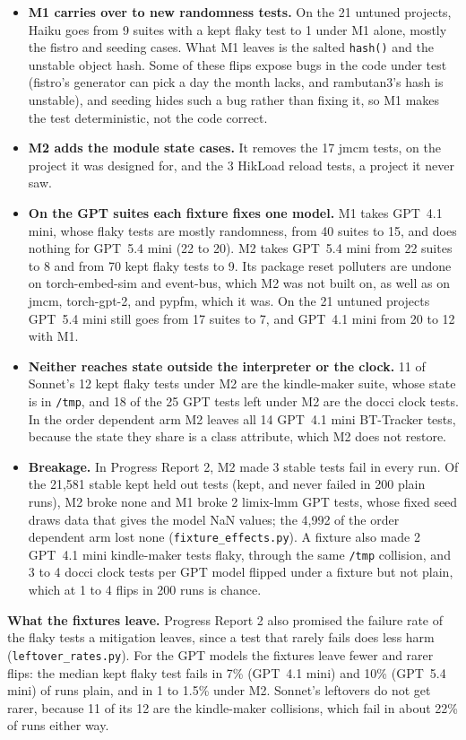 \begin{itemize}
\item \textbf{M1 carries over to new randomness tests.} On the 21 untuned projects, Haiku goes from 9 suites with a kept flaky test to 1 under M1 alone, mostly the fistro and seeding cases. What M1 leaves is the salted \texttt{hash()} and the unstable object hash. Some of these flips expose bugs in the code under test (fistro's generator can pick a day the month lacks, and rambutan3's hash is unstable), and seeding hides such a bug rather than fixing it, so M1 makes the test deterministic, not the code correct.
\item \textbf{M2 adds the module state cases.} It removes the 17 jmcm tests, on the project it was designed for, and the 3 HikLoad reload tests, a project it never saw.
\item \textbf{On the GPT suites each fixture fixes one model.} M1 takes GPT~4.1 mini, whose flaky tests are mostly randomness, from 40 suites to 15, and does nothing for GPT~5.4 mini (22 to 20). M2 takes GPT~5.4 mini from 22 suites to 8 and from 70 kept flaky tests to 9. Its package reset polluters are undone on torch-embed-sim and event-bus, which M2 was not built on, as well as on jmcm, torch-gpt-2, and pypfm, which it was. On the 21 untuned projects GPT~5.4 mini still goes from 17 suites to 7, and GPT~4.1 mini from 20 to 12 with M1.
\item \textbf{Neither reaches state outside the interpreter or the clock.} 11 of Sonnet's 12 kept flaky tests under M2 are the kindle-maker suite, whose state is in \texttt{/tmp}, and 18 of the 25 GPT tests left under M2 are the docci clock tests. In the order dependent arm M2 leaves all 14 GPT~4.1 mini BT-Tracker tests, because the state they share is a class attribute, which M2 does not restore.
\item \textbf{Breakage.} In Progress Report 2, M2 made 3 stable tests fail in every run. Of the 21,581 stable kept held out tests (kept, and never failed in 200 plain runs), M2 broke none and M1 broke 2 limix-lmm GPT tests, whose fixed seed draws data that gives the model NaN values; the 4,992 of the order dependent arm lost none (\texttt{fixture\_effects.py}). A fixture also made 2 GPT~4.1 mini kindle-maker tests flaky, through the same \texttt{/tmp} collision, and 3 to 4 docci clock tests per GPT model flipped under a fixture but not plain, which at 1 to 4 flips in 200 runs is chance.
\end{itemize}
\textbf{What the fixtures leave.} Progress Report 2 also promised the failure rate of the flaky tests a mitigation leaves, since a test that rarely fails does less harm (\texttt{leftover\_rates.py}). For the GPT models the fixtures leave fewer and rarer flips: the median kept flaky test fails in 7\% (GPT~4.1 mini) and 10\% (GPT~5.4 mini) of runs plain, and in 1 to 1.5\% under M2. Sonnet's leftovers do not get rarer, because 11 of its 12 are the kindle-maker collisions, which fail in about 22\% of runs either way.

